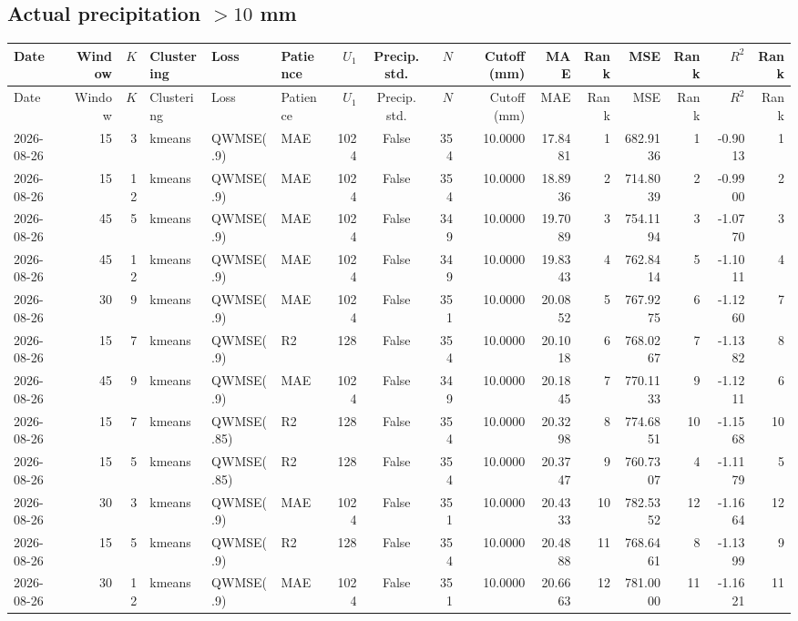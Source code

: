 \documentclass[10pt]{article}
\begin{document}
\begin{landscape}
\subsection*{Actual precipitation $>10$ mm}
\footnotesize
\setlength{\tabcolsep}{3pt}
\begin{longtable}{@{}lrrlllrcrrrrrrrr@{}}
\toprule
Date & Window & $K$ & Clustering & Loss & Patience & $U_1$ & Precip. std. & $N$ & Cutoff (mm) & MAE & Rank & MSE & Rank & $R^2$ & Rank \\
\midrule
\endfirsthead
\toprule
Date & Window & $K$ & Clustering & Loss & Patience & $U_1$ & Precip. std. & $N$ & Cutoff (mm) & MAE & Rank & MSE & Rank & $R^2$ & Rank \\
\midrule
\endhead
2026-08-26 & 15 & 3 & kmeans & QWMSE(.9) & MAE & 1024 & False & 354 & 10.0000 & 17.8481 & 1 & 682.9136 & 1 & -0.9013 & 1 \\
2026-08-26 & 15 & 12 & kmeans & QWMSE(.9) & MAE & 1024 & False & 354 & 10.0000 & 18.8936 & 2 & 714.8039 & 2 & -0.9900 & 2 \\
2026-08-26 & 45 & 5 & kmeans & QWMSE(.9) & MAE & 1024 & False & 349 & 10.0000 & 19.7089 & 3 & 754.1194 & 3 & -1.0770 & 3 \\
2026-08-26 & 45 & 12 & kmeans & QWMSE(.9) & MAE & 1024 & False & 349 & 10.0000 & 19.8343 & 4 & 762.8414 & 5 & -1.1011 & 4 \\
2026-08-26 & 30 & 9 & kmeans & QWMSE(.9) & MAE & 1024 & False & 351 & 10.0000 & 20.0852 & 5 & 767.9275 & 6 & -1.1260 & 7 \\
2026-08-26 & 15 & 7 & kmeans & QWMSE(.9) & R2 & 128 & False & 354 & 10.0000 & 20.1018 & 6 & 768.0267 & 7 & -1.1382 & 8 \\
2026-08-26 & 45 & 9 & kmeans & QWMSE(.9) & MAE & 1024 & False & 349 & 10.0000 & 20.1845 & 7 & 770.1133 & 9 & -1.1211 & 6 \\
2026-08-26 & 15 & 7 & kmeans & QWMSE(.85) & R2 & 128 & False & 354 & 10.0000 & 20.3298 & 8 & 774.6851 & 10 & -1.1568 & 10 \\
2026-08-26 & 15 & 5 & kmeans & QWMSE(.85) & R2 & 128 & False & 354 & 10.0000 & 20.3747 & 9 & 760.7307 & 4 & -1.1179 & 5 \\
2026-08-26 & 30 & 3 & kmeans & QWMSE(.9) & MAE & 1024 & False & 351 & 10.0000 & 20.4333 & 10 & 782.5352 & 12 & -1.1664 & 12 \\
2026-08-26 & 15 & 5 & kmeans & QWMSE(.9) & R2 & 128 & False & 354 & 10.0000 & 20.4888 & 11 & 768.6461 & 8 & -1.1399 & 9 \\
2026-08-26 & 30 & 12 & kmeans & QWMSE(.9) & MAE & 1024 & False & 351 & 10.0000 & 20.6663 & 12 & 781.0000 & 11 & -1.1621 & 11 \\

\end{longtable}
\end{landscape}
\end{document}
